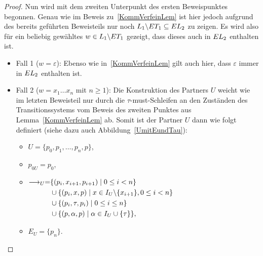 \begin{proof}
  Nun wird mit dem zweiten Unterpunkt des ersten Beweispunktes begonnen. Genau
  wie im Beweis zu~\ref{KommVerfeinLem} ist hier jedoch aufgrund des bereits
  geführten Beweisteils nur noch $L_1\backslash ET _1\subseteq EL _2$ zu
  zeigen. Es wird also für ein beliebig gewähltes $w\in L_1\backslash ET _1$
  gezeigt, dass dieses auch in $EL _2$ enthalten ist.
  \begin{itemize}
    \item Fall 1 ($w=\varepsilon$): Ebenso wie in~\ref{KommVerfeinLem} gilt
      auch hier, dass $\varepsilon$ immer in $EL _2$ enthalten ist.
    \item Fall 2 ($w=x_1\dots x_n$ mit $n\geq 1$): Die Konstruktion des
      Partners $U$ weicht wie im letzten Beweisteil nur durch die
      $\tau$-must-Schleifen an den Zuständen des Transitionssystems vom Beweis des
      zweiten Punktes aus Lemma~\ref{KommVerfeinLem} ab. Somit ist der Partner
      $U$ dann wie folgt definiert (siehe dazu auch Abbildung~\ref{UmitEundTau}):
      \begin{itemize}
        \item $U=\{p_0,p_1,\dots ,p_n,p\}$,
        \item $p_{0U}=p_0$,
        \item $\begin{aligned}[t]
            \must _U=&\{(p_i,x_{i+1},p_{i+1})\mid 0\leq i< n\}\\
            &\cup\{(p_i,x,p)\mid x\in I_U\backslash\{x_{i+1}\},0\leq i < n\}\\
            &\cup\{(p_i,\tau ,p_i)\mid 0\leq i\leq n\}\\
            &\cup\{(p,\alpha ,p)\mid \alpha\in I_U\cup \{\tau\}\},
              \end{aligned}$
        \item $E_U=\{p_n\}$.
      \end{itemize}
      \begin{figure} [h!tbp]
      \begin{center}
\end{center}
\end{figure}
\end{itemize}
\end{proof}
